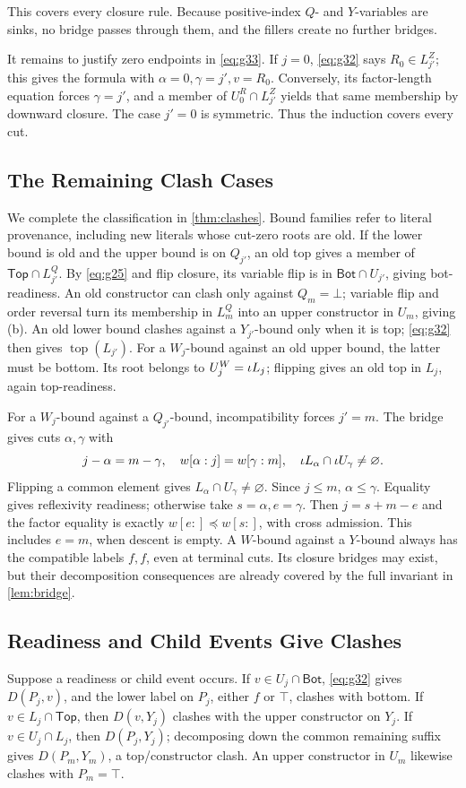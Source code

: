 This covers every closure rule. Because positive-index $Q$- and
$Y$-variables are sinks, no bridge passes through them, and the fillers
create no further bridges.

It remains to justify zero endpoints in \eqref{eq:g33}. If $j=0$, \eqref{eq:g32} says
$R_0\in L^Z_{j'}$; this gives the formula with $\alpha=0,\gamma=j',v=R_0$.
Conversely, its factor-length equation forces $\gamma=j'$, and a member of
$U^R_0\cap L^Z_{j'}$ yields that same membership by downward closure.
The case $j'=0$ is symmetric. Thus the induction covers every cut. 

\subsection{The Remaining Clash Cases}
We complete the classification in \cref{thm:clashes}. Bound families refer
to literal provenance, including new literals whose cut-zero roots are old.
If the lower bound is old and the upper bound is on $Q_{j'}$, an old top
gives a member of $\mathsf{Top}\cap L^Q_{j'}$. By \eqref{eq:g25} and flip closure, its variable flip is
in $\mathsf{Bot}\cap U_{j'}$, giving bot-readiness. An old constructor
can clash only against $Q_m=\bot$; variable flip and order reversal turn its membership in
$L^Q_m$ into an upper constructor in $U_m$, giving (b).
An old lower bound clashes against a $Y_{j'}$-bound only when it is top;
\eqref{eq:g32} then gives $\operatorname{top}(L_{j'})$.
For a $W_j$-bound against an old upper bound, the latter must be bottom.
Its root belongs to $U^W_j=\iota L_j$; flipping gives an old top in $L_j$,
again top-readiness.

For a $W_j$-bound against a $Q_{j'}$-bound, incompatibility forces $j'=m$.
The bridge gives cuts $\alpha,\gamma$ with
\[
 j-\alpha=m-\gamma,\quad w[\alpha:j]=w[\gamma:m],\quad
 \iota L_\alpha\cap\iota U_\gamma\ne\varnothing.
\]
Flipping a common element gives $L_\alpha\cap U_\gamma\ne\varnothing$.
Since $j\le m$, $\alpha\le\gamma$. Equality gives reflexivity readiness;
otherwise take $s=\alpha,e=\gamma$. Then $j=s+m-e$ and the factor
equality is exactly $w[e:]\preceq w[s:]$, with cross admission.
This includes $e=m$, when descent is empty. A $W$-bound against a
$Y$-bound always has the compatible labels $f,f$, even at terminal cuts.
Its closure bridges may exist, but their decomposition consequences are
already covered by the full invariant in \cref{lem:bridge}.


\subsection{Readiness and Child Events Give Clashes}
Suppose a readiness or child event occurs. If $v\in U_j\cap\mathsf{Bot}$,
\eqref{eq:g32} gives $D(P_j,v)$, and the lower label on $P_j$, either $f$
or $\top$, clashes with bottom. If
$v\in L_j\cap\mathsf{Top}$, then $D(v,Y_j)$ clashes with the upper
constructor on $Y_j$. If $v\in U_j\cap L_j$, then
$D(P_j,Y_j)$; decomposing down the common remaining suffix gives
$D(P_m,Y_m)$, a top/constructor clash. An upper constructor in $U_m$
likewise clashes with $P_m=\top$.
